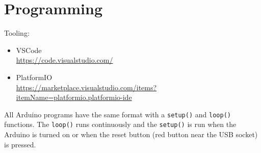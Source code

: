 \documentclass[a4paper, 11pt]{article}
\begin{document}
\section{Programming}

Tooling: 

\begin{itemize}
  \item VSCode \\
  \url{https://code.visualstudio.com/}
  \item PlatformIO \\
  \url{https://marketplace.visualstudio.com/items?itemName=platformio.platformio-ide}
\end{itemize}

All Arduino programs have the same format with a \verb|setup()| and \verb|loop()| functions.
The \verb|loop()| runs continuously and the \verb|setup()| is run
when the Arduino is turned on
or
when the reset button (red button near the USB socket) is pressed.
\end{document}

